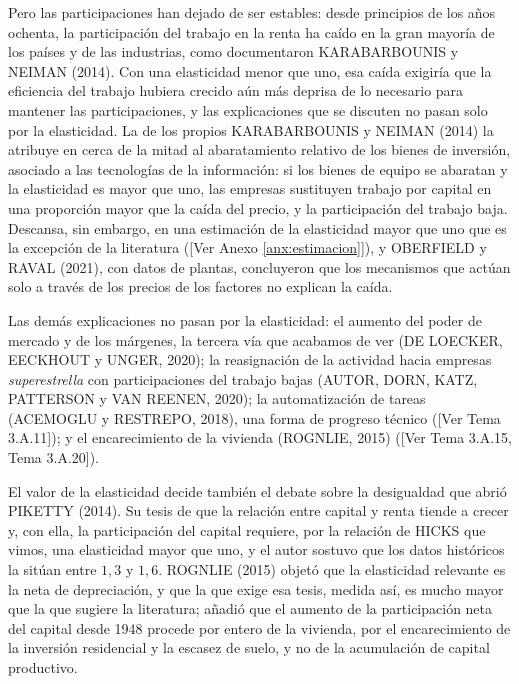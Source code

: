 \documentclass[10pt,a4paper]{article}
\newcommand{\authorfont}[1]{{\fontfamily{EBGaramond-TLF}\selectfont #1}}
\begin{document}
Pero las participaciones han dejado de ser estables: desde principios de los años ochenta, la participación del trabajo en la renta ha caído en la gran mayoría de los países y de las industrias, como documentaron KARABARBOUNIS y NEIMAN (2014). Con una elasticidad menor que uno, esa caída exigiría que la eficiencia del trabajo hubiera crecido aún más deprisa de lo necesario para mantener las participaciones, y las explicaciones que se discuten no pasan solo por la elasticidad. La de los propios KARABARBOUNIS y NEIMAN (2014) la atribuye en cerca de la mitad al abaratamiento relativo de los bienes de inversión, asociado a las tecnologías de la información: si los bienes de equipo se abaratan y la elasticidad es mayor que uno, las empresas sustituyen trabajo por capital en una proporción mayor que la caída del precio, y la participación del trabajo baja. Descansa, sin embargo, en una estimación de la elasticidad mayor que uno que es la excepción de la literatura ([\authorfont{Ver Anexo \ref{anx:estimacion}}]), y OBERFIELD y RAVAL (2021), con datos de plantas, concluyeron que los mecanismos que actúan solo a través de los precios de los factores no explican la caída.

Las demás explicaciones no pasan por la elasticidad: el aumento del poder de mercado y de los márgenes, la tercera vía que acabamos de ver (DE LOECKER, EECKHOUT y UNGER, 2020); la reasignación de la actividad hacia empresas \textit{superestrella} con participaciones del trabajo bajas (AUTOR, DORN, KATZ, PATTERSON y VAN REENEN, 2020); la automatización de tareas (ACEMOGLU y RESTREPO, 2018), una forma de progreso técnico ([\authorfont{Ver Tema 3.A.11}]); y el encarecimiento de la vivienda (ROGNLIE, 2015) ([\authorfont{Ver Tema 3.A.15, Tema 3.A.20}]).

El valor de la elasticidad decide también el debate sobre la desigualdad que abrió PIKETTY (2014). Su tesis de que la relación entre capital y renta tiende a crecer y, con ella, la participación del capital requiere, por la relación de HICKS que vimos, una elasticidad mayor que uno, y el autor sostuvo que los datos históricos la sitúan entre $1{,}3$ y $1{,}6$. ROGNLIE (2015) objetó que la elasticidad relevante es la neta de depreciación, y que la que exige esa tesis, medida así, es mucho mayor que la que sugiere la literatura; añadió que el aumento de la participación neta del capital desde 1948 procede por entero de la vivienda, por el encarecimiento de la inversión residencial y la escasez de suelo, y no de la acumulación de capital productivo.
\end{document}
